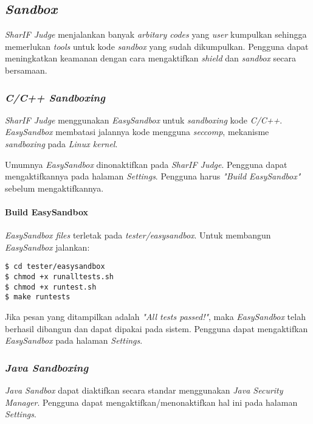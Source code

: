 \subsection{\textit{Sandbox}}
\label{subsec:sandbox}
\textit{SharIF Judge} menjalankan banyak \textit{arbitary codes} yang \textit{user} kumpulkan sehingga memerlukan \textit{tools} untuk kode \textit{sandbox} yang sudah dikumpulkan. Pengguna dapat meningkatkan keamanan dengan cara mengaktifkan \textit{shield} dan \textit{sandbox} secara bersamaan.

\subsubsection{\textit{C/C++ Sandboxing}}
\label{subsubsec:sandbox_c/c++}
\textit{SharIF Judge} menggunakan \textit{EasySandbox} untuk \textit{sandboxing} kode \textit{C/C++}. \textit{EasySandbox} membatasi jalannya kode mengguna \textit{seccomp}, mekanisme \textit{sandboxing} pada \textit{Linux kernel}.

Umumnya \textit{EasySandbox} dinonaktifkan pada \textit{SharIF Judge}. Pengguna dapat mengaktifkannya pada halaman \textit{Settings}. Pengguna harus \textit{"Build EasySandbox"} sebelum mengaktifkannya.

\paragraph{Build EasySandbox}

\textit{EasySandbox files} terletak pada \textit{tester/easysandbox}. Untuk membangun \textit{EasySandbox} jalankan:

\begin{lstlisting}[basicstyle=\ttfamily, frame=single,
columns=fullflexible, keepspaces=true, breaklines=true, label=ls:18]
$ cd tester/easysandbox
$ chmod +x runalltests.sh
$ chmod +x runtest.sh
$ make runtests
\end{lstlisting}

Jika pesan yang ditampilkan adalah \textit{"All tests passed!"}, maka \textit{EasySandbox} telah berhasil dibangun dan dapat dipakai pada sistem. Pengguna dapat mengaktifkan \textit{EasySandbox} pada halaman \textit{Settings}.

\subsubsection{\textit{Java Sandboxing}}
\label{subsubsec:java_sandbox}
\textit{Java Sandbox} dapat diaktifkan secara standar menggunakan \textit{Java Security Manager}. Pengguna dapat mengaktifkan/menonaktifkan hal ini pada halaman \textit{Settings}.

